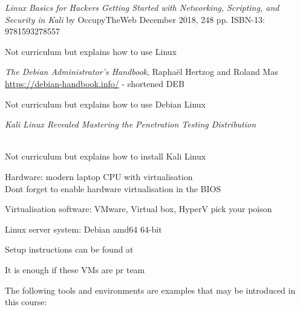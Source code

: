 \documentclass[Screen16to9,17pt]{foils}
\begin{document}


\emph{Linux Basics for Hackers
Getting Started with Networking, Scripting, and Security in Kali}
by OccupyTheWeb
December 2018, 248 pp.
ISBN-13:
9781593278557

Not curriculum but explains how to use Linux



\emph{The Debian Administrator’s Handbook}, Raphaël Hertzog and Roland Mas\\
\url{https://debian-handbook.info/} - shortened DEB

Not curriculum but explains how to use Debian Linux



\emph{Kali Linux Revealed  Mastering the Penetration Testing Distribution}

\\
Not curriculum but explains how to install Kali Linux






\begin{list2}
\item Hardware: modern laptop CPU with virtualisation\\
Dont forget to enable hardware virtualisation in the BIOS
\item Virtualisation software: VMware, Virtual box, HyperV pick your poison
\item Linux server system: Debian amd64 64-bit 
\item Setup instructions can be found at 
\end{list2}

\centerline{It is enough if these VMs are pr team}



The following tools and environments are examples that may be introduced in this course:
\end{document}
